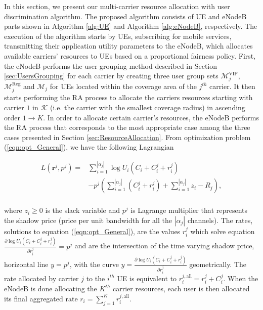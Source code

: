 \documentclass[journal]{IEEEtran} 				\IEEEoverridecommandlockouts 						\usepackage{amsmath,amssymb}
\begin{document}
In this section, we present our multi-carrier resource allocation with user discrimination algorithm. The proposed algorithm consists of UE and eNodeB parts shown in Algorithm \ref{alg:UE} and Algorithm \ref{alg:eNodeB}, respectively. The execution of the algorithm starts by UEs, subscribing for mobile services, transmitting their application utility parameters to the eNodeB, which allocates available carriers' resources to UEs based on a proportional fairness policy. First, the eNodeB performs the user grouping method described in Section \ref{sec:UsersGrouping} for each carrier by creating three user group sets $\mathcal{M}_j^{\text{VIP}}$, $\mathcal{M}_j^{\text{Reg}}$ and $\mathcal{M}_j$ for UEs located within the coverage area of the $j^{th}$ carrier. It then starts performing the RA process to allocate the carriers resources starting with carrier $1$ in $\mathcal{K}$ (i.e. the carrier with the smallest coverage radius) in ascending order $1 \rightarrow K$. In order to allocate certain carrier's resources, the eNodeB performs the RA process that corresponds to the most appropriate case among the three cases presented in Section \ref{sec:ResourceAllocation}. From optimization problem (\ref{eqn:opt_General}), we have the following Lagrangian

\begin{equation}\label{eqn:lagrangian}
\begin{aligned}
L(\textbf{r}^j,p^j) =
& \sum_{i=1}^{|\alpha_j|}\log U_i(C_i+C_i^j+r_i^j)\\
& -p^j(\sum_{i=1}^{|\alpha_j|}(C_i^j+r_i^j) + \sum_{i=1}^{|\alpha_j|}z_{i} - R_j),\\
\end{aligned}
\end{equation}

where $z_{i}\geq 0$ is the slack variable and $p^j$ is Lagrange multiplier that represents the shadow price (price per unit bandwidth for all the $|\alpha_j|$ channels). The rates, solutions to equation (\ref{eqn:opt_General}), are the values $r_i^j$ which solve equation $\frac{\partial \log U_i(C_i+C_i^j+r_i^j)}{\partial r_i^j} = p^j$ and are the intersection of the time varying shadow price, horizontal line $y = p^j$, with the curve $y = \frac{\partial \log U_i(C_i+C_i^j+r_i^j)}{\partial r_i^j}$ geometrically. The rate allocated by carrier $j$ to the $i^{th}$ UE is equivalent to $r_i^{j,\text{all}}=r_i^j+C_i^j$. When the eNodeB is done allocating the $K^{th}$ carrier resources, each user is then allocated its final aggregated rate $r_i = \sum_{j=1}^{K}r_i^{j,\text{all}}$.
\end{document}
